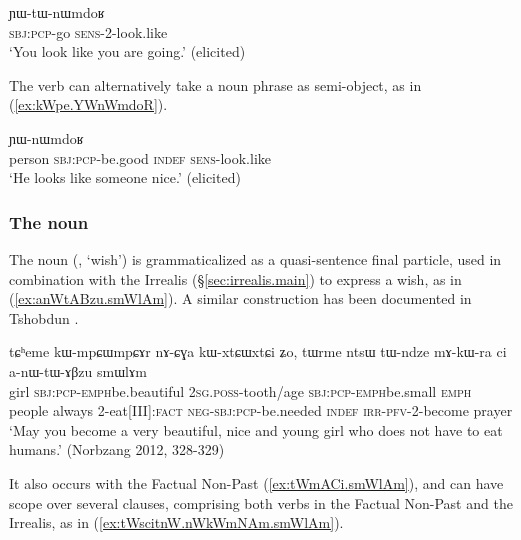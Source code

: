 \begin{exe}
	\ex \label{ex:kWCe.YWtWnWmdoR}
	\gll [kɯ-ɕe] ɲɯ-tɯ-nɯmdoʁ \\
	\textsc{sbj}:\textsc{pcp}-go \textsc{sens}-2-look.like \\
	\glt `You look like you are going.' (elicited)
\end{exe}  

The verb  can alternatively take a noun phrase as semi-object, as in (\ref{ex:kWpe.YWnWmdoR}).

\begin{exe}
	\ex \label{ex:kWpe.YWnWmdoR}
	\gll [tɯrme kɯ-pe ci] ɲɯ-nɯmdoʁ \\
	person \textsc{sbj}:\textsc{pcp}-be.good \textsc{indef} \textsc{sens}-look.like \\
	\glt `He looks like someone nice.' (elicited)
\end{exe}  



\subsubsection{The noun  } \label{sec:smWlAm.TAME}
The noun  (, `wish') is grammaticalized as a quasi-sentence final particle, used in combination with the Irrealis (§\ref{sec:irrealis.main}) to express a wish, as in (\ref{ex:anWtABzu.smWlAm}). A similar construction has been documented in Tshobdun \citep{jackson07irrealis}.

\begin{exe}
	\ex \label{ex:anWtABzu.smWlAm}
	\gll tɕʰeme kɯ-mpɕɯ\redp{}mpɕɤr nɤ-ɕɣa kɯ-xtɕɯ\redp{}xtɕi ʑo, tɯrme ntsɯ tɯ-ndze mɤ-kɯ-ra ci a-nɯ-tɯ-ɤβzu smɯlɤm \\
	girl \textsc{sbj}:\textsc{pcp}-\textsc{emph}\redp{}be.beautiful   \textsc{2sg}.\textsc{poss}-tooth/age  \textsc{sbj}:\textsc{pcp}-\textsc{emph}\redp{}be.small \textsc{emph}  people always 2-eat[III]:\textsc{fact} \textsc{neg}-\textsc{sbj}:\textsc{pcp}-be.needed \textsc{indef} \textsc{irr}-\textsc{pfv}-2-become prayer \\
	\glt `May you become a very beautiful, nice and young girl who does not have to eat humans.' (Norbzang 2012, 328-329)
\end{exe}

It also occurs with the Factual Non-Past (\ref{ex:tWmACi.smWlAm}), and can have scope over several clauses, comprising both verbs in the Factual Non-Past and the Irrealis, as in (\ref{ex:tWscitnW.nWkWmNAm.smWlAm}).

